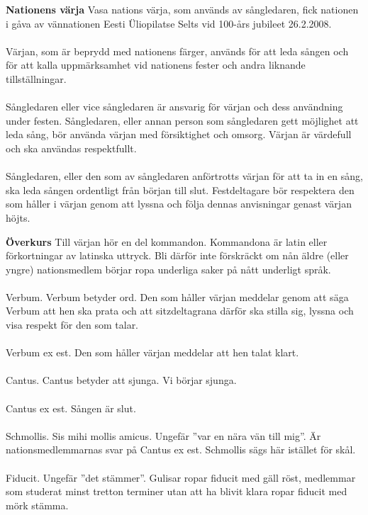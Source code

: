 \begin{intersong}
\flushleft\textbf{Nationens värja}
Vasa nations värja, som används av sångledaren, fick nationen i gåva av vännationen Eesti Üliopilatse Selts vid 100-års jubileet 26.2.2008. 
\\
~\\
Värjan, som är beprydd med nationens färger, används för att leda sången och för att kalla uppmärksamhet vid nationens fester och andra liknande tillställningar.
\\
~\\
Sångledaren eller vice sångledaren är ansvarig för värjan och dess användning under festen. Sångledaren, eller annan person som sångledaren gett möjlighet att leda sång, bör använda värjan med försiktighet och omsorg. Värjan är värdefull och ska användas respektfullt. 
\\
~\\
Sångledaren, eller den som av sångledaren anförtrotts värjan för att ta in en sång, ska leda sången ordentligt från början till slut. Festdeltagare bör respektera den som håller i värjan genom att lyssna och följa dennas anvisningar genast värjan höjts.

\flushleft\textbf{Överkurs}
Till värjan hör en del kommandon. Kommandona är latin eller förkortningar av latinska uttryck. Bli därför inte förskräckt om nån äldre (eller yngre) nationsmedlem börjar ropa underliga saker på nått underligt språk. 
\\
~\\
Verbum. Verbum betyder ord. Den som håller värjan meddelar genom att säga Verbum att hen ska prata och att sitzdeltagrana därför ska stilla sig, lyssna och visa respekt för den som talar.
\\
~\\
Verbum ex est. Den som håller värjan meddelar att hen talat klart.
\\
~\\
Cantus.  Cantus betyder att sjunga. Vi börjar sjunga.
\\
~\\
Cantus ex est. Sången är slut.
\\
~\\
Schmollis. Sis mihi mollis amicus. Ungefär ”var en nära vän till mig”. Är nationsmedlemmarnas svar på Cantus ex est. Schmollis sägs här istället för skål.  
\\
~\\
Fiducit. Ungefär ”det stämmer”. Gulisar ropar fiducit med gäll röst, medlemmar som studerat minst tretton terminer utan att ha blivit klara ropar fiducit med mörk stämma.

\end{intersong}